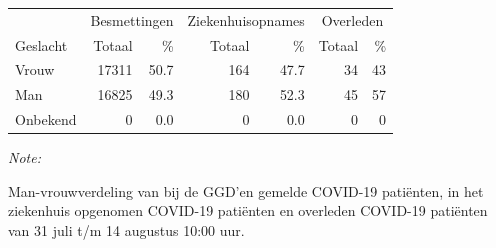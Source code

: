 \documentclass[
  english,
  man,floatsintext]{apa6}
\begin{document}
\begin{table}
\centering\begingroup\fontsize{11}{13}\selectfont

\begin{threeparttable}
\begin{tabular}{lrrrrrr}
\toprule
\multicolumn{1}{c}{ } & \multicolumn{2}{c}{Besmettingen} & \multicolumn{2}{c}{Ziekenhuisopnames} & \multicolumn{2}{c}{Overleden} \\
\cmidrule(l{3pt}r{3pt}){2-3} \cmidrule(l{3pt}r{3pt}){4-5} \cmidrule(l{3pt}r{3pt}){6-7}
Geslacht & Totaal & \% & Totaal & \% & Totaal & \%\\
\midrule
Vrouw & 17311 & 50.7 & 164 & 47.7 & 34 & 43\\
Man & 16825 & 49.3 & 180 & 52.3 & 45 & 57\\
Onbekend & 0 & 0.0 & 0 & 0.0 & 0 & 0\\
\bottomrule
\end{tabular}
\begin{tablenotes}
\item \textit{Note: } 
\item Man-vrouwverdeling van bij de GGD’en gemelde COVID-19 patiënten, in het ziekenhuis opgenomen COVID-19 patiënten en overleden COVID-19 patiënten van 31 juli t/m 14 augustus 10:00 uur.
\end{tablenotes}
\end{threeparttable}
\endgroup{}
\end{table}
\newpage
\end{document}

